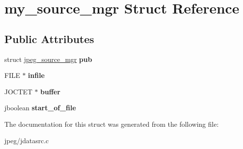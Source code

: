 \hypertarget{structmy__source__mgr}{}\section{my\+\_\+source\+\_\+mgr Struct Reference}
\label{structmy__source__mgr}
\subsection*{Public Attributes}
\begin{DoxyCompactItemize}
\item 
struct \hyperlink{structjpeg__source__mgr}{jpeg\+\_\+source\+\_\+mgr} {\bfseries pub}\hypertarget{structmy__source__mgr_a8572f33f87bec948592001edea12680f}{}\label{structmy__source__mgr_a8572f33f87bec948592001edea12680f}

\item 
F\+I\+LE $\ast$ {\bfseries infile}\hypertarget{structmy__source__mgr_a157a49dcdfd5723e566b1b8a35394a04}{}\label{structmy__source__mgr_a157a49dcdfd5723e566b1b8a35394a04}

\item 
J\+O\+C\+T\+ET $\ast$ {\bfseries buffer}\hypertarget{structmy__source__mgr_ab92bf51a7ca44e0d3909aeb21fb0b0f8}{}\label{structmy__source__mgr_ab92bf51a7ca44e0d3909aeb21fb0b0f8}

\item 
jboolean {\bfseries start\+\_\+of\+\_\+file}\hypertarget{structmy__source__mgr_adae94c0ae9cdafca5968213e1c050d84}{}\label{structmy__source__mgr_adae94c0ae9cdafca5968213e1c050d84}

\end{DoxyCompactItemize}


The documentation for this struct was generated from the following file\+:\begin{DoxyCompactItemize}
\item 
jpeg/jdatasrc.\+c\end{DoxyCompactItemize}
